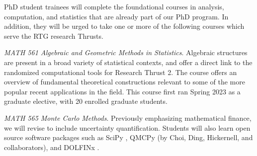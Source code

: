 \documentclass[11pt]{NSFamsart}
\begin{document}

PhD student trainees will complete the foundational courses in analysis, computation, and statistics that are already part of our PhD program.  In addition, they will be urged to take one or more of the following courses which serve the RTG research Thrusts.  


\emph{MATH 561 Algebraic and Geometric Methods in Statistics}. Algebraic structures are present in a broad variety of statistical contexts, and offer a direct link to the randomized computational tools for Research Thrust 2. The course offers an overview of fundamental theoretical constructions relevant to some of the more popular recent applications in the field. This course first ran Spring 2023 as a graduate elective, with 20 enrolled graduate students. 

\emph{MATH 565 Monte Carlo Methods}. Previously emphasizing mathematical finance, we will revise to include uncertainty quantification. Students will also learn  open source software packages such as SciPy \cite{virtanen2020scipy}, QMCPy \cite{QMCPy2020a} (by Choi, Ding, Hickernell, and collaborators), and DOLFINx \cite{Dolphin12}. 
\end{document}
